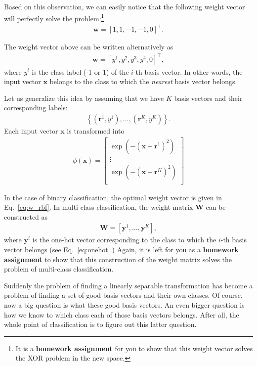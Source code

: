 \documentclass{report}
\newcommand{\vect}[1]{\mathbf{#1}}
\newcommand{\matr}[1]{\mathbf{#1}}
\newcommand{\vx}[0]{\vect{x}}
\newcommand{\vw}[0]{\vect{w}}
\newcommand{\vy}[0]{\vect{y}}
\newcommand{\vr}[0]{\vect{r}}
\newcommand{\mW}[0]{\matr{W}}
\begin{document}
Based on this observation, we can easily notice that the following weight vector
will perfectly solve the problem:\footnote{
    It is a {\bf homework assignment} for you to show that this weight vector
    solves the XOR problem in the new space. 
}
\begin{align*}
    \vw = \left[ 1, 1, -1, -1, 0 \right]^\top.
\end{align*}

The weight vector above can be written alternatively as 
\begin{align}
    \label{eq:w_rbf}
    \vw = \left[ y^1, y^2, y^3, y^4, 0\right]^\top,
\end{align}
where $y^i$ is the class label (-1 or 1) of the $i$-th basis vector.
In other words, the input vector $\vx$ belongs to the class to which the {\it
nearest} basis vector belongs. 

Let us generalize this idea by assuming that we have $K$ basis vectors and their
corresponding labels:
\begin{align*}
    \left\{ (\vr^1, y^1), \ldots, (\vr^K, y^K) \right\}.
\end{align*}
Each input vector $\vx$ is transformed into
\begin{align}
    \label{eq:W_rbf}
    \phi(\vx) = \left[ 
        \begin{array}{c}
            \exp\left( -(\vx - \vr^1)^2 \right)  \\
            \vdots \\
            \exp\left( -(\vx - \vr^K)^2 \right)  \\
        \end{array}
    \right]
\end{align}

In the case of binary classification, the optimal weight vector is given in
Eq.~\eqref{eq:w_rbf}. In multi-class classification, the weight matrix $\mW$ can
be constructed as
\begin{align*}
    \mW = \left[
        \vy^1, \ldots, \vy^K
    \right],
\end{align*}
where $\vy^i$ is the one-hot vector corresponding to the class to which the
$i$-th basis vector belongs (see Eq.~\eqref{eq:onehot}.) Again, it is left for
you as a {\bf homework assignment} to show that this construction of the weight
matrix solves the problem of multi-class classification.

Suddenly the problem of finding a linearly separable transformation has become a
problem of finding a set of good basis vectors and their own classes. Of course,
now a big question is what these good basis vectors. An even bigger question is
how we know to which class each of those basis vectors belongs. After all, the
whole point of classification is to figure out this latter question.
\end{document}
